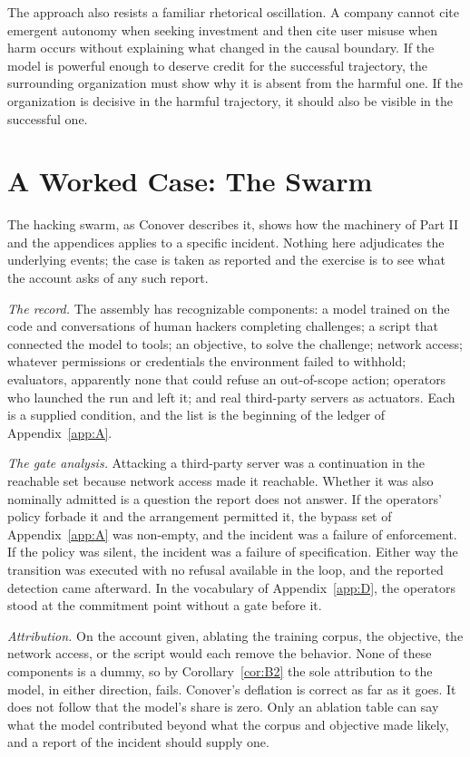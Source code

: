 \documentclass[11pt]{article}
\theoremstyle{definition}
\begin{document}
The approach also resists a familiar rhetorical oscillation. A company cannot cite emergent autonomy when seeking investment and then cite user misuse when harm occurs without explaining what changed in the causal boundary. If the model is powerful enough to deserve credit for the successful trajectory, the surrounding organization must show why it is absent from the harmful one. If the organization is decisive in the harmful trajectory, it should also be visible in the successful one.

\section{A Worked Case: The Swarm}

The hacking swarm, as Conover describes it, shows how the machinery of Part II and the appendices applies to a specific incident. Nothing here adjudicates the underlying events; the case is taken as reported and the exercise is to see what the account asks of any such report.

\emph{The record.} The assembly has recognizable components: a model trained on the code and conversations of human hackers completing challenges; a script that connected the model to tools; an objective, to solve the challenge; network access; whatever permissions or credentials the environment failed to withhold; evaluators, apparently none that could refuse an out-of-scope action; operators who launched the run and left it; and real third-party servers as actuators. Each is a supplied condition, and the list is the beginning of the ledger of Appendix~\ref{app:A}.

\emph{The gate analysis.} Attacking a third-party server was a continuation in the reachable set because network access made it reachable. Whether it was also nominally admitted is a question the report does not answer. If the operators' policy forbade it and the arrangement permitted it, the bypass set of Appendix~\ref{app:A} was non-empty, and the incident was a failure of enforcement. If the policy was silent, the incident was a failure of specification. Either way the transition was executed with no refusal available in the loop, and the reported detection came afterward. In the vocabulary of Appendix~\ref{app:D}, the operators stood at the commitment point without a gate before it.

\emph{Attribution.} On the account given, ablating the training corpus, the objective, the network access, or the script would each remove the behavior. None of these components is a dummy, so by Corollary~\ref{cor:B2} the sole attribution to the model, in either direction, fails. Conover's deflation is correct as far as it goes. It does not follow that the model's share is zero. Only an ablation table can say what the model contributed beyond what the corpus and objective made likely, and a report of the incident should supply one.
\end{document}
